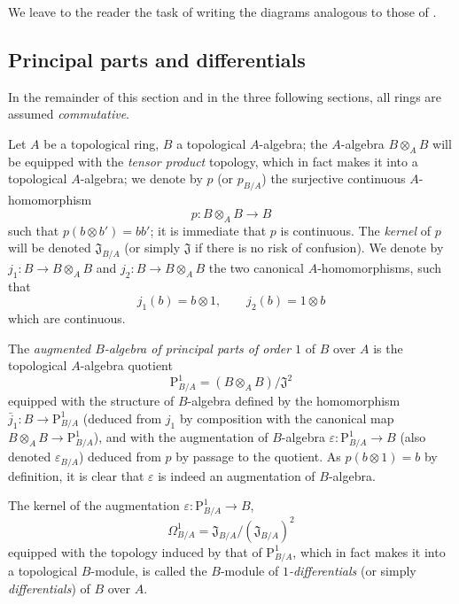 We leave to the reader the task of writing the diagrams analogous to those of .

\subsection{Principal parts and differentials}
\label{subsection:0.20.4}

In the remainder of this section and in the three following sections, all rings are assumed \emph{commutative}.

\begin{env}[20.4.1]
\label{0.20.4.1}
Let $A$ be a topological ring, $B$ a topological $A$-algebra; the $A$-algebra $B\otimes_A B$ will be equipped with the \emph{tensor product} topology, which in fact makes it into a topological $A$-algebra; we denote by $p$ (or $p_{B/A}$) the surjective continuous $A$-homomorphism
\begin{equation}
\tag{20.4.1.1}
  \label{0.20.4.1.1}
  p:B\otimes_A B\to B
\end{equation}
such that $p(b\otimes b')=bb'$; it is immediate that $p$ is continuous.
The \emph{kernel} of $p$ will be denoted $\mathfrak{J}_{B/A}$ (or simply $\mathfrak{J}$ if there is no risk of confusion).
We denote by $j_1:B\to B\otimes_A B$ and $j_2:B\to B\otimes_A B$ the two canonical $A$-homomorphisms, such that
\[
  j_1(b) = b\otimes 1, \qquad j_2(b) = 1\otimes b
\]
which are continuous.
\end{env}

\begin{definition}[20.4.2]
\label{0.20.4.2}
The \emph{augmented $B$-algebra of principal parts of order $1$} of $B$ over $A$ is the topological $A$-algebra quotient
\begin{equation}
\tag{20.4.2.1}
  \label{0.20.4.2.1}
  \mathrm{P}^1_{B/A} = (B\otimes_A B)/\mathfrak{J}^2
\end{equation}
equipped with the structure of $B$-algebra defined by the homomorphism $\bar{j}_1:B\to\mathrm{P}^1_{B/A}$ (deduced from $j_1$ by composition with the canonical map $B\otimes_A B\to\mathrm{P}^1_{B/A}$), and with the augmentation of $B$-algebra $\varepsilon:\mathrm{P}^1_{B/A}\to B$ (also denoted $\varepsilon_{B/A}$) deduced from $p$ by passage to the quotient.
As $p(b\otimes 1)=b$ by definition, it is clear that $\varepsilon$ is indeed an augmentation of $B$-algebra.
\end{definition}

\begin{definition}[20.4.3]
\label{0.20.4.3}
The kernel of the augmentation $\varepsilon:\mathrm{P}^1_{B/A}\to B$,
\begin{equation}
\tag{20.4.3.1}
  \label{0.20.4.3.1}
  \Omega^1_{B/A} = \mathfrak{J}_{B/A}/(\mathfrak{J}_{B/A})^2
\end{equation}
equipped with the topology induced by that of $\mathrm{P}^1_{B/A}$, which in fact makes it into a topological $B$-module, is called the $B$-module of \emph{$1$-differentials} (or simply \emph{differentials}) of $B$ over $A$.
\end{definition}

